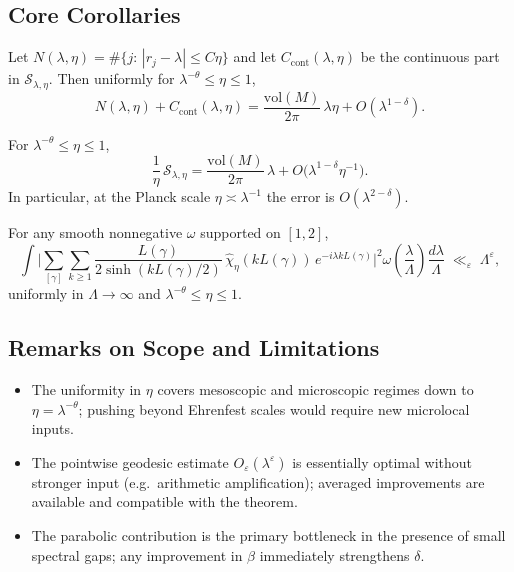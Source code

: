 \subsection{Core Corollaries} \label{subsec:7.2-cor}

\begin{corollary}
Let \(N(\lambda,\eta)=\#\{j:\,|r_j-\lambda|\le C\eta\}\) and let \(C_{\mathrm{cont}}(\lambda,\eta)\) be the continuous part in \(\mathcal{S}_{\lambda,\eta}\).
Then uniformly for \(\lambda^{-\theta}\le \eta\le 1\),
\[
  N(\lambda,\eta) + C_{\mathrm{cont}}(\lambda,\eta)
  = \frac{\mathrm{vol}(M)}{2\pi}\,\lambda\eta + O(\lambda^{1-\delta}).
\]
\end{corollary}

\begin{corollary}
For \(\lambda^{-\theta}\le \eta\le 1\),
\[
  \frac{1}{\eta}\,\mathcal{S}_{\lambda,\eta}
  = \frac{\mathrm{vol}(M)}{2\pi}\,\lambda + O\!\big(\lambda^{1-\delta}\eta^{-1}\big).
\]
In particular, at the Planck scale \(\eta\asymp \lambda^{-1}\) the error is \(O(\lambda^{2-\delta})\).
\end{corollary}

\begin{corollary}
For any smooth nonnegative \(\omega\) supported on \([1,2]\),
\[
  \int \Bigg|\sum_{[\gamma]}\sum_{k\ge1}
   \frac{L(\gamma)}{2\sinh(kL(\gamma)/2)}\,
   \widehat{\chi}_\eta(kL(\gamma))\,e^{-i\lambda kL(\gamma)} \Bigg|^2
   \omega\!\left(\frac{\lambda}{\Lambda}\right)\frac{d\lambda}{\Lambda}
   \;\ll_\varepsilon\; \Lambda^{\varepsilon},
\]
uniformly in \(\Lambda\to\infty\) and \(\lambda^{-\theta}\le \eta\le 1\).
\end{corollary}

\subsection{Remarks on Scope and Limitations} \label{subsec:7.2-scope}

\begin{itemize}
  \item The uniformity in \(\eta\) covers mesoscopic and microscopic regimes down to \(\eta=\lambda^{-\theta}\); pushing beyond Ehrenfest scales would require new microlocal inputs.
  \item The pointwise geodesic estimate \(O_\varepsilon(\lambda^\varepsilon)\) is essentially optimal without stronger input (e.g.\ arithmetic amplification); averaged improvements are available and compatible with the theorem.
  \item The parabolic contribution is the primary bottleneck in the presence of small spectral gaps; any improvement in \(\beta\) immediately strengthens \(\delta\).
\end{itemize}

